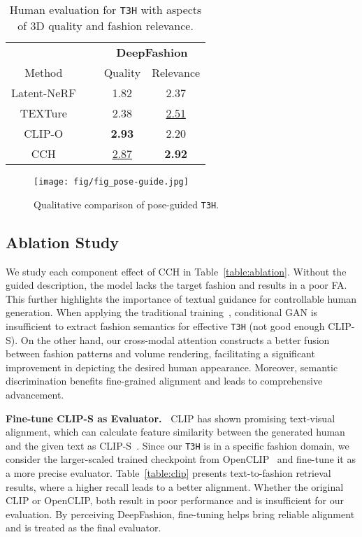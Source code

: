 \documentclass[11pt]{article}
\newcommand{\tablestyle}[2]{\setlength{\tabcolsep}{#1}\renewcommand{\arraystretch}{#2}\centering\footnotesize}
\begin{document}
\begin{table}[t]
\centering \tablestyle{5pt}{1.1}
    \begin{tabular}{cccc}
        \toprule
        ~ & ~ & \multicolumn{2}{c}{\textbf{DeepFashion}} \\
        \cmidrule{3-4} Method & ~ & Quality & Relevance \\
        \midrule
        Latent-NeRF & ~ & 1.82 & 2.37 \\
        TEXTure & ~ & 2.38 & \underline{2.51} \\
        CLIP-O & ~ & \textbf{2.93} & 2.20 \\
        CCH & ~ & \underline{2.87} & \textbf{2.92} \\
        \bottomrule
    \end{tabular}
    \vspace{-1.5ex}
    \caption{Human evaluation for \texttt{T3H} with aspects of 3D quality and fashion relevance.}
    \label{table:human}
    \vspace{-3ex}
\end{table}

\begin{figure*}[t]
\centering
    \texttt{[image: fig/fig\_pose-guide.jpg]}
    \vspace{-3.5ex}
    \caption{Qualitative comparison of pose-guided \texttt{T3H}.}
    \vspace{-2ex}
    \label{fig:pose-guide}
\end{figure*}

\subsection{Ablation Study}
We study each component effect of CCH in Table~\ref{table:ablation}. Without the guided description, the model lacks the target fashion and results in a poor FA. This further highlights the importance of textual guidance for controllable human generation. When applying the traditional training~\cite{reed2016t2i}, conditional GAN is insufficient to extract fashion semantics for effective \texttt{T3H} (not good enough CLIP-S). On the other hand, our cross-modal attention constructs a better fusion between fashion patterns and volume rendering, facilitating a significant improvement in depicting the desired human appearance. Moreover, semantic discrimination benefits fine-grained alignment and leads to comprehensive advancement.

\vspace{1ex} \noindent \textbf{Fine-tune CLIP-S as Evaluator.~}
CLIP has shown promising text-visual alignment, which can calculate feature similarity between the generated human and the given text as CLIP-S~\cite{hessel2021clip-s}. Since our \texttt{T3H} is in a specific fashion domain, we consider the larger-scaled trained checkpoint from OpenCLIP~\cite{openclip} and fine-tune it as a more precise evaluator. Table~\ref{table:clip} presents text-to-fashion retrieval results, where a higher recall leads to a better alignment. Whether the original CLIP or OpenCLIP, both result in poor performance and is insufficient for our evaluation. By perceiving DeepFashion, fine-tuning helps bring reliable alignment and is treated as the final evaluator.
\end{document}
